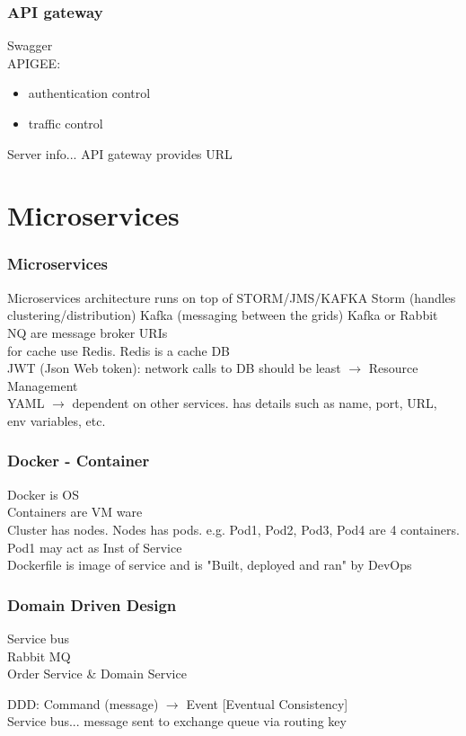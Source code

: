 \documentclass{beamer}
\begin{document}
\begin{frame}\frametitle{API gateway}
	Swagger\\
	APIGEE:\\
	\begin{itemize}
		\item authentication control
		\item traffic control
	\end{itemize}
	Server info... API gateway provides URL
\end{frame}






\section{Microservices}

\begin{frame}
	\frametitle{Microservices}
	Microservices architecture runs on top of STORM/JMS/KAFKA \newline
	Storm (handles clustering/distribution) \newline
	Kafka (messaging between the grids) \newline
	Kafka or Rabbit NQ are message broker URIs\\
	for cache use Redis. Redis is a cache DB\\
	JWT (Json Web token): network calls to DB should be least $\rightarrow$ Resource Management\\
	YAML $\rightarrow$ dependent on other services. has details such as name, port, URL, env variables, etc.
\end{frame}


\begin{frame}\frametitle{Docker - Container}
	Docker is OS\\
	Containers are VM ware\\
	Cluster has nodes. Nodes has pods. e.g. Pod1, Pod2, Pod3, Pod4 are 4 containers. Pod1 may act as Inst of Service\\
	Dockerfile is image of service and is "Built, deployed and ran" by DevOps\\
\end{frame}

\begin{frame}\frametitle{Domain Driven Design}
	Service bus\\
	Rabbit MQ\\
	Order Service \& Domain Service

	DDD: Command (message) $\rightarrow$ Event [Eventual Consistency]\\
	
	Service bus... message sent to exchange queue via routing key
\end{frame}
\end{document}
